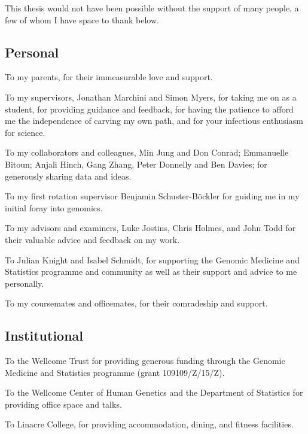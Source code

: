 
This thesis would not have been possible without the support of many people, a few of whom I have space to thank below.

\subsection*{Personal}

To my parents, for their immeasurable love and support.

To my supervisors, Jonathan Marchini and Simon Myers, for taking me on as a student, for providing guidance and feedback, for having the patience to afford me the independence of carving my own path, and for your infectious enthusiasm for science.

To my collaborators and colleagues, Min Jung and Don Conrad; Emmanuelle Bitoun; Anjali Hinch, Gang Zhang, Peter Donnelly and Ben Davies; for generously sharing data and ideas.

To my first rotation supervisor Benjamin Schuster-Böckler for guiding me in my initial foray into genomics.

To my advisors and examiners, Luke Jostins, Chris Holmes, and John Todd for their valuable advice and feedback on my work.

To Julian Knight and Isabel Schmidt, for supporting the Genomic Medicine and Statistics programme and community as well as their support and advice to me personally.

To my coursemates and officemates, for their comradeship and support.

\subsection*{Institutional}

To the Wellcome Trust for providing generous funding through the Genomic Medicine and Statistics programme (grant 109109/Z/15/Z).

To the Wellcome Center of Human Genetics and the Department of Statistics for providing office space and talks.

To Linacre College, for providing accommodation, dining, and fitness facilities.